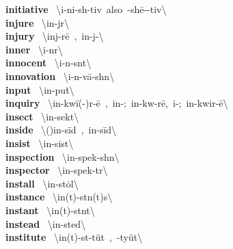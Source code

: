\documentclass[10pt,a4paper]{article}
\begin{document}
\begin{multicols}{2}
\textbf{ initiative }\quad \ \textbackslash i-\textprimstress ni-sh\textschwa -tiv\ also\ -sh\={e}-\textschwa -tiv\textbackslash \\
\textbf{ injure }\quad \ \textbackslash \textprimstress in-j\textschwa r\textbackslash \\
\textbf{ injury }\quad \ \textbackslash \textprimstress inj-r\={e}\ ,\ \textprimstress in-j\textschwa -\textbackslash \\
\textbf{ inner }\quad \ \textbackslash \textprimstress i-n\textschwa r\textbackslash \\
\textbf{ innocent }\quad \ \textbackslash \textprimstress i-n\textschwa -s\textschwa nt\textbackslash \\
\textbf{ innovation }\quad \ \textbackslash \textsecstress i-n\textschwa -\textprimstress v\={a}-sh\textschwa n\textbackslash \\
\textbf{ input }\quad \ \textbackslash \textprimstress in-\textsecstress pu\. t\textbackslash \\
\textbf{ inquiry }\quad \ \textbackslash in-\textprimstress kw\={i}(-\textschwa )r-\={e}\ ,\ \textprimstress in-\textsecstress ;\ \textprimstress in-kw\textschwa -r\={e},\ \textprimstress i\engma -;\ \textprimstress in-\textsecstress kwir-\={e}\textbackslash \\
\textbf{ insect }\quad \ \textbackslash \textprimstress in-\textsecstress sekt\textbackslash \\
\textbf{ inside }\quad \ \textbackslash (\textsecstress )in-\textprimstress s\={i}d\ ,\ \textprimstress in-\textsecstress s\={i}d\textbackslash \\
\textbf{ insist }\quad \ \textbackslash in-\textprimstress sist\textbackslash \\
\textbf{ inspection }\quad \ \textbackslash in-\textprimstress spek-sh\textschwa n\textbackslash \\
\textbf{ inspector }\quad \ \textbackslash in-\textprimstress spek-t\textschwa r\textbackslash \\
\textbf{ install }\quad \ \textbackslash in-\textprimstress st\.{o}l\textbackslash \\
\textbf{ instance }\quad \ \textbackslash \textprimstress in(t)-st\textschwa n(t)s\textbackslash \\
\textbf{ instant }\quad \ \textbackslash \textprimstress in(t)-st\textschwa nt\textbackslash \\
\textbf{ instead }\quad \ \textbackslash in-\textprimstress sted\textbackslash \\
\textbf{ institute }\quad \ \textbackslash \textprimstress in(t)-st\textschwa -\textsecstress t\"{u}t\ ,\ -\textsecstress ty\"{u}t\textbackslash \\

\end{multicols}
\end{document}
